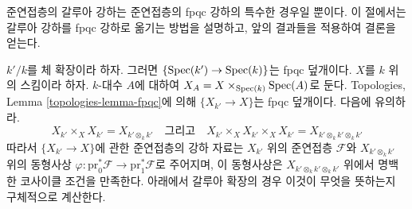 \noindent
준연접층의 갈루아 강하는 준연접층의 fpqc 강하의 특수한 경우일 뿐이다.
이 절에서는 갈루아 강하를 fpqc 강하로 옮기는 방법을 설명하고, 앞의
결과들을 적용하여 결론을 얻는다.

\medskip\noindent
$k'/k$를 체 확장이라 하자. 그러면 $\{\mathop{\mathrm{Spec}}(k') \to \mathop{\mathrm{Spec}}(k)\}$는 fpqc
덮개이다. $X$를 $k$ 위의 스킴이라 하자. $k$-대수 $A$에 대하여
$X_A = X \times_{\mathop{\mathrm{Spec}}(k)} \mathop{\mathrm{Spec}}(A)$로 둔다. Topologies, Lemma
\ref{topologies-lemma-fpqc}에 의해 $\{X_{k'} \to X\}$는 fpqc 덮개이다.
다음에 유의하라.
$$
X_{k'} \times_X X_{k'} = X_{k' \otimes_k k'}
\quad\text{그리고}\quad
X_{k'} \times_X X_{k'} \times_X X_{k'} = X_{k' \otimes_k k' \otimes_k k'}
$$
따라서 $\{X_{k'} \to X\}$에 관한 준연접층의 강하 자료는
$X_{k'}$ 위의 준연접층 $\mathcal{F}$와
$X_{k' \otimes_k k'}$ 위의 동형사상
$\varphi : \text{pr}_0^*\mathcal{F} \to \text{pr}_1^*\mathcal{F}$로 주어지며,
이 동형사상은 $X_{k' \otimes_k k' \otimes_k k'}$ 위에서 명백한 코사이클
조건을 만족한다. 아래에서 갈루아 확장의 경우 이것이 무엇을 뜻하는지
구체적으로 계산한다.

